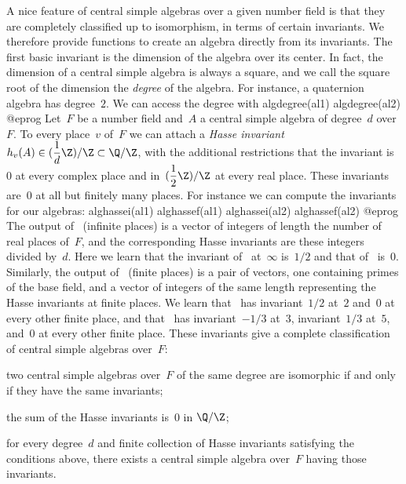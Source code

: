 A nice feature of central simple algebras over a given number field is that they
are completely classified up to isomorphism, in terms of certain invariants. We
therefore provide functions to create an algebra directly from its invariants.
The first basic invariant is the dimension of the algebra over its center.
In fact, the
dimension of a central simple algebra is always a square, and we call the square
root of the dimension the \emph{degree} of the algebra. For instance, a
quaternion algebra has degree~$2$. We can access the degree with
\bprog
algdegree(al1)
algdegree(al2)
@eprog\noindent
Let~$F$ be a number field and~$A$ a central simple algebra of degree~$d$
over~$F$. To every place~$v$ of~$F$ we can attach a \emph{Hasse invariant}
$h_v(A)\in(\dfrac{1}{d}\Z)/\Z\subset\Q/\Z$, with
the additional restrictions that the invariant is~$0$ at every complex place and
in~$(\dfrac{1}{2}\Z)/\Z$ at every real place. These
invariants are~$0$ at all but finitely many places. For instance we can compute
the invariants for our algebras:
\bprog
alghassei(al1)
alghassef(al1)
alghassei(al2)
alghassef(al2)
@eprog\noindent
The output of~ (infinite places) is a vector of integers of length the number
of real places of~$F$, and the corresponding Hasse invariants are these integers
divided by~$d$. Here we learn that the invariant of~ at~$\infty$
is~$1/2$ and that of~ is~$0$. Similarly, the output of~
(finite places) is a pair of vectors, one containing primes of the base field,
and a vector of integers of the same length representing the Hasse invariants at
finite places. We learn that~ has invariant~$1/2$ at~$2$ and~$0$ at
every other finite place, and that~ has invariant~$-1/3$ at~$3$,
invariant~$1/3$ at~$5$, and~$0$ at every other finite place.
These invariants give a complete classification of central simple
algebras over~$F$:

 \item two central simple algebras over~$F$ of the same degree are isomorphic if
   and only if they have the same invariants;

 \item the sum of the Hasse invariants is~$0$ in $\Q/\Z$;

 \item for every degree~$d$ and finite collection of Hasse invariants satisfying
   the conditions above, there exists a central simple algebra over~$F$ having
   those invariants.

